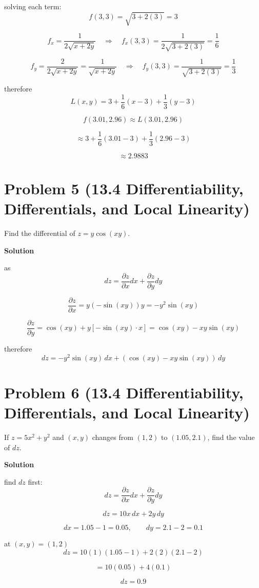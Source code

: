 \documentclass{article}
\newcommand{\solution}{\textbf{\large Solution}}
\theoremstyle{remark}
\begin{document}
solving each term:
\[
    f(3,3) = \sqrt{3 + 2(3)} = 3
\]

\[
    f_x = \frac{1}{2\sqrt{x+2y}}
    \quad \Rightarrow \quad
    f_x(3,3) = \frac{1}{2\sqrt{3 + 2(3)}} = \frac{1}{6}
\]

\[
    f_y = \frac{2}{2\sqrt{x+2y}} = \frac{1}{\sqrt{x+2y}}
    \quad \Rightarrow \quad
    f_y(3,3) = \frac{1}{\sqrt{3 + 2(3)}} = \frac{1}{3}
\]

therefore
\[
    L(x,y) = 3 + \frac{1}{6}(x-3) + \frac{1}{3}(y-3)
\]

\[
    f(3.01,2.96) \approx L(3.01,2.96)
\]

\[
    \approx 3 + \frac{1}{6}(3.01-3) + \frac{1}{3}(2.96-3)
\]

\[
    \boxed{\approx 2.9883}
\]

\vspace{1em}
\hrulefill

\section*{Problem 5 (13.4 Differentiability, Differentials, and Local Linearity)}
Find the differential of $z = y \cos(xy)$.

\medskip
\solution

as
\[
    dz = \frac{\partial z}{\partial x}dx + \frac{\partial z}{\partial y}dy
\]

\[
    \frac{\partial z}{\partial x}
    = y(-\sin(xy))y
    = -y^2\sin(xy)
\]

\[
    \frac{\partial z}{\partial y}
    = \cos(xy) + y[-\sin(xy)\cdot x]
    = \cos(xy) - xy\sin(xy)
\]

therefore
\[
    \boxed{dz = -y^2\sin(xy)\,dx + \left(\cos(xy) - xy\sin(xy)\right)\,dy}
\]

\vspace{1em}
\hrulefill

\section*{Problem 6 (13.4 Differentiability, Differentials, and Local Linearity)}
If $z = 5x^2 + y^2$ and $(x, y)$ changes from $(1, 2)$ to $(1.05, 2.1)$, find the value of $dz$.

\medskip
\solution

find $dz$ first:
\[
    dz = \frac{\partial z}{\partial x}dx + \frac{\partial z}{\partial y}dy
\]

\[
    dz = 10x\,dx + 2y\,dy
\]

\[
    dx = 1.05 - 1 = 0.05, \qquad dy = 2.1 - 2 = 0.1
\]

at $(x,y) = (1,2)$
\[
    dz = 10(1)(1.05 - 1) + 2(2)(2.1 - 2)
\]

\[
    = 10(0.05) + 4(0.1)
\]

\[
    \boxed{dz = 0.9}
\]
\end{document}
